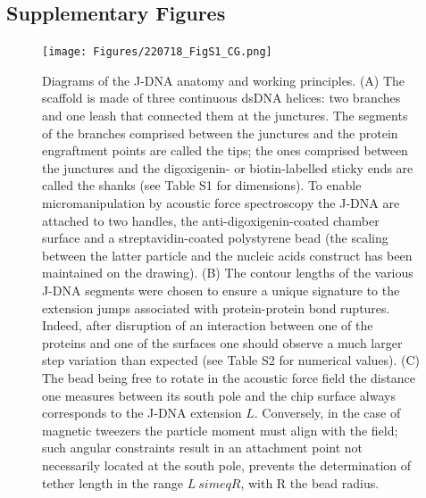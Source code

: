 \documentclass{biophys-new}
\begin{document}
\FloatBarrier

\newpage

\subsection*{Supplementary Figures}

\begin{figure}[hbt!]
	\centering

	\texttt{[image: Figures/220718\_FigS1\_CG.png]}
	
	\caption{Diagrams of the J-DNA anatomy and working principles. (A) The scaffold is made of three continuous dsDNA helices: two branches and one leash that connected them at the junctures. The segments of the branches comprised between the junctures and the protein engraftment points are called the tips; the ones comprised between the junctures and the digoxigenin- or biotin-labelled sticky ends are called the shanks (see Table S1 for dimensions). To enable micromanipulation by acoustic force spectroscopy the J-DNA are attached to two handles, the anti-digoxigenin-coated chamber surface and a streptavidin-coated polystyrene bead (the scaling between the latter particle and the nucleic acids construct has been maintained on the drawing). (B) The contour lengths of the various J-DNA segments were chosen to ensure a unique signature to the extension jumps associated with protein-protein bond ruptures. Indeed, after disruption of an interaction between one of the proteins and one of the surfaces one should observe a much larger step variation than expected (see Table S2 for numerical values). (C) The bead being free to rotate in the acoustic force field the distance one measures between its south pole and the chip surface always corresponds to the J-DNA extension $L$. Conversely, in the case of magnetic tweezers the particle moment must align with the field; such angular constraints result in an attachment point not necessarily located at the south pole, prevents the determination of tether length in the range $L \ simeq R$, with R the bead radius.}
	\label{fig:JDNA_anatomy}
\end{figure}
\end{document}
